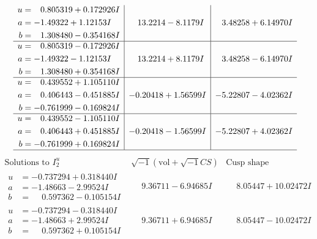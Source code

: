 \documentclass[1p]{elsarticle_modified}
\theoremstyle{definition}
\newcommand{\I}{\sqrt{-1}}
\begin{document}
$$\begin{array}{c|c|c}
\begin{aligned}
u &= \phantom{-}0.805319 + 0.172926 I \\
a &= -1.49322 + 1.12153 I \\
b &= \phantom{-}1.308480 - 0.354168 I\end{aligned}
 & \phantom{-}13.2214 - 8.1179 I & \phantom{-}3.48258 + 6.14970 I \\ \hline\begin{aligned}
u &= \phantom{-}0.805319 - 0.172926 I \\
a &= -1.49322 - 1.12153 I \\
b &= \phantom{-}1.308480 + 0.354168 I\end{aligned}
 & \phantom{-}13.2214 + 8.1179 I & \phantom{-}3.48258 - 6.14970 I \\ \hline\begin{aligned}
u &= \phantom{-}0.439552 + 1.105110 I \\
a &= \phantom{-}0.406443 - 0.451885 I \\
b &= -0.761999 - 0.169824 I\end{aligned}
 & -0.20418 + 1.56599 I & -5.22807 - 4.02362 I \\ \hline\begin{aligned}
u &= \phantom{-}0.439552 - 1.105110 I \\
a &= \phantom{-}0.406443 + 0.451885 I \\
b &= -0.761999 + 0.169824 I\end{aligned}
 & -0.20418 - 1.56599 I & -5.22807 + 4.02362 I\\
 \hline 
 \end{array}$$\newpage$$\begin{array}{c|c|c}  
\text{Solutions to }I^u_{2}& \I (\text{vol} + \sqrt{-1}CS) & \text{Cusp shape}\\
 \hline 
\begin{aligned}
u &= -0.737294 + 0.318440 I \\
a &= -1.48663 - 2.99524 I \\
b &= \phantom{-}0.597362 - 0.105154 I\end{aligned}
 & \phantom{-}9.36711 - 6.94685 I & \phantom{-}8.05447 + 10.02472 I \\ \hline\begin{aligned}
u &= -0.737294 - 0.318440 I \\
a &= -1.48663 + 2.99524 I \\
b &= \phantom{-}0.597362 + 0.105154 I\end{aligned}
 & \phantom{-}9.36711 + 6.94685 I & \phantom{-}8.05447 - 10.02472 I \\ \hline\begin{aligned}

\end{aligned}
\end{array}$$
\end{document}
